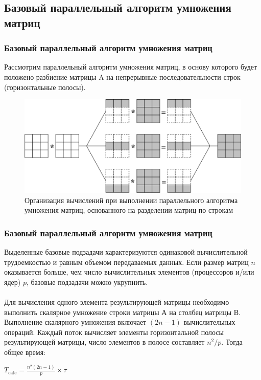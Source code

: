 \documentclass{beamer}
\begin{document}
\subsection{Базовый параллельный алгоритм умножения матриц}

\begin{frame}
\frametitle{Базовый параллельный алгоритм умножения матриц}

Рассмотрим параллельный алгоритм умножения матриц, в основу которого будет положено разбиение
матрицы A на непрерывные последовательности строк (горизонтальные полосы).

\begin{figure}
\includegraphics[scale=0.32]{res/pic005}
\caption{Организация вычислений при выполнении параллельного алгоритма умножения матриц, основанного на разделении матриц по строкам}
\end{figure}

\end{frame}


\begin{frame}
\frametitle{Базовый параллельный алгоритм умножения матриц}

Выделенные базовые подзадачи характеризуются одинаковой вычислительной трудоемкостью и равным объемом передаваемых данных. Если размер матриц $n$ оказывается больше, чем число вычислительных элементов (процессоров и/или ядер) $p$, базовые подзадачи можно укрупнить.\\~\\

Для вычисления одного элемента результирующей матрицы необходимо выполнить скалярное
умножение строки матрицы А на столбец матрицы В. Выполнение скалярного умножения включает $(2n-1)$
вычислительных операций. Каждый поток вычисляет элементы горизонтальной полосы результирующей
матрицы, число элементов в полосе составляет $n^2 /p$. Тогда общее время:

\begin{center}
$T_{\text{calc}} = \frac{n^2(2n-1)}{p} \times \tau$
\end{center}

\end{frame}
\end{document}
